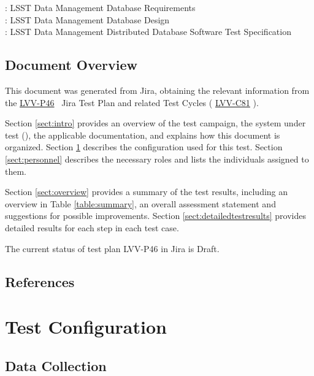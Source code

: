 \documentclass[DM,lsstdraft,STR,toc]{lsstdoc}
\begin{document}
: LSST Data Management Database Requirements\\
: LSST Data Management Database Design\\
: LSST Data Management Distributed Database Software Test
Specification


\subsection{Document Overview}
\label{sect:docoverview}

This document was generated from Jira, obtaining the relevant information from the 
\href{https://jira.lsstcorp.org/secure/Tests.jspa#/testPlan/LVV-P46}{LVV-P46}
~Jira Test Plan and related Test Cycles (
  \href{https://jira.lsstcorp.org/secure/Tests.jspa#/testCycle/LVV-C81}{LVV-C81}
).

Section \ref{sect:intro} provides an overview of the test campaign, the system under test (\product{}), the applicable documentation, and explains how this document is organized.
Section \ref{sect:configuration}  describes the configuration used for this test.
Section \ref{sect:personnel} describes the necessary roles and lists the individuals assigned to them.

Section \ref{sect:overview} provides a summary of the test results, including an overview in Table \ref{table:summary}, an overall assessment statement and suggestions for possible improvements.
Section \ref{sect:detailedtestresults} provides detailed results for each step in each test case.

The current status of test plan LVV-P46 in Jira is Draft.

\subsection{References}
\label{sect:references}
\renewcommand{\refname}{}

\section{Test Configuration}
\label{sect:configuration}

\subsection{Data Collection}
\end{document}
